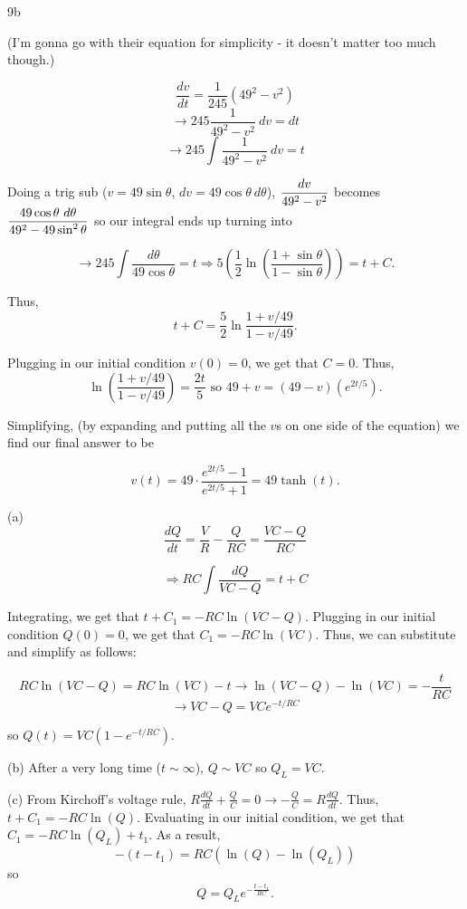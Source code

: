 \documentclass[../../diff_eqs.tex]{subfiles}
\begin{document}
\begin{exercise}{9b}
    
    (I'm gonna go with their equation for simplicity - it doesn't matter too much though.) 

    $$\frac{dv}{dt} = \frac{1}{245}\left(49^2 - v^2\right)$$
    $$\rightarrow 245 \frac{1}{49^2 - v^2} \ dv = dt$$ 
    $$\rightarrow 245 \int \frac{1}{49^2 - v^2} \ dv = t$$

    Doing a trig sub ($v = 49 \sin \theta$, $dv = 49 \cos \theta \ d\theta$), $\mathlarger{\frac{dv}{49^2 - v^2}}$ becomes $\mathlarger{\frac{49 \cos \theta \ d\theta}{49^2 - 49 \sin^2 \theta}}$ so our integral ends up turning into 

    $$\longrightarrow 245 \int \frac{d\theta}{49 \cos \theta} = t \Longrightarrow 5\left(\frac{1}{2} \ln\left(\frac{1 + \sin \theta}{1 - \sin \theta}\right)\right) = t + C\text{.}$$

    Thus, 
    $$t + C = \frac{5}{2} \ln \frac{1 + v/49}{1 - v/49}\text{.}$$ 

    Plugging in our initial condition $v(0) = 0$, we get that $C = 0$. Thus, $$\ln\left(\frac{1 + v/49}{1 - v/49}\right) = \frac{2t}{5} \text{ so } 49 + v = (49 - v)(e^{2t/5})\text{.}$$

    Simplifying, (by expanding and putting all the $v$s on one side of the equation) we find our final answer to be 
    
    $$v(t) = 49 \cdot \frac{e^{2t/5} - 1}{e^{2t/5} + 1} = 49\tanh(t)\text{.}$$

\end{exercise}

\begin{exercise}{13}
    
    (a)
    $$\frac{dQ}{dt} = \frac{V}{R} - \frac{Q}{RC} = \frac{VC - Q}{RC}$$

    $$\Rightarrow RC \int \frac{dQ}{VC - Q} = t + C$$

    Integrating, we get that $t + C_1 = -RC\ln(VC - Q)$. Plugging in our initial condition $Q(0) = 0$, we get that $C_1 = -RC\ln(VC)$. Thus, we can substitute and simplify as follows:

    $$RC \ln(VC - Q) = RC \ln(VC) - t \rightarrow \ln(VC - Q) - \ln(VC) = -\frac{t}{RC}$$
    $$\rightarrow VC - Q = VCe^{-t/RC}$$

    so $Q(t) = VC(1 - e^{-t/RC})$.

    \emspacer 

    (b) After a very long time ($t \sim \infty$), $Q \sim VC$ so $Q_L = VC$.

    \emspacer

    (c) From Kirchoff's voltage rule, $R\frac{dQ}{dt} + \frac{Q}{C} = 0 \longrightarrow -\frac{Q}{C} = R\frac{dQ}{dt}$. Thus, $t + C_1 = -RC\ln(Q)$. Evaluating in our initial condition, we get that $C_1 = -RC \ln(Q_L) + t_1$. As a result, $$-(t - t_1) = RC(\ln(Q) - \ln(Q_L))$$ so $$ Q = Q_L e^{-\frac{t - t_1}{RC}}\text{.}$$ 

\end{exercise}
\end{document}
